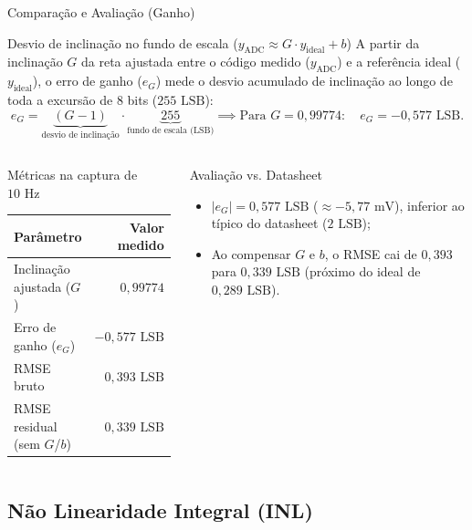 \documentclass{beamer}
\begin{document}
\begin{frame}{Comparação e Avaliação (Ganho)}
\begin{block}{Desvio de inclinação no fundo de escala ($y_{\text{ADC}} \approx G\cdot y_{\text{ideal}} + b$)}
\footnotesize
A partir da inclinação $G$ da reta ajustada entre o código medido ($y_{\text{ADC}}$) e a referência ideal ($y_{\text{ideal}}$), o erro de ganho ($e_G$) mede o desvio acumulado de inclinação ao longo de toda a excursão de 8 bits ($255\text{ LSB}$):
\[
e_G = \underbrace{(G - 1)}_{\text{desvio de inclinação}} \cdot \underbrace{255}_{\text{fundo de escala (LSB)}} \implies \text{Para } G = 0{,}99774:\quad e_G = \boxed{-0{,}577\text{ LSB}}.
\]
\end{block}

\begin{columns}[c]
\begin{block}{Métricas na captura de $10\text{ Hz}$}
\scriptsize
\setlength{\tabcolsep}{4pt}
\renewcommand{\arraystretch}{1.12}
\begin{tabular*}{\linewidth}{@{\extracolsep{\fill}}lr}
\hline
\textbf{Parâmetro} & \textbf{Valor medido}\\\hline
Inclinação ajustada ($G$) & $0{,}99774$\\
Erro de ganho ($e_G$) & $-0{,}577\text{ LSB}$\\
RMSE bruto & $0{,}393\text{ LSB}$\\
RMSE residual (sem $G$/$b$) & $0{,}339\text{ LSB}$\\\hline
\end{tabular*}
\end{block}

\begin{exampleblock}{Avaliação vs. Datasheet}
\footnotesize
\begin{itemize}
\item $|e_G| = 0{,}577\text{ LSB}$ ($\approx -5{,}77\text{ mV}$), inferior ao típico do datasheet ($2\text{ LSB}$);
\item Ao compensar $G$ e $b$, o RMSE cai de $0{,}393$ para $0{,}339\text{ LSB}$ (próximo do ideal de $0{,}289\text{ LSB}$).
\end{itemize}
\end{exampleblock}
\end{columns}
\end{frame}

\subsection{Não Linearidade Integral (INL)}
\end{document}
